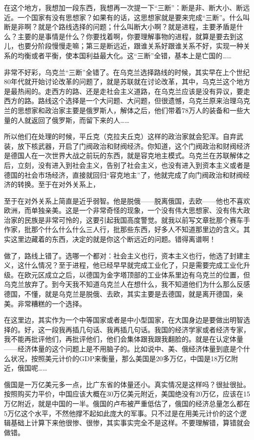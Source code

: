 \documentclass[UTF8, 12pt, a4paper]{ctexrep}
\begin{document}
在这个地方，我想加一段东西，我想再一次提一下“三断”：断是非、断大小、断远近。一个国家有没有思想家？如果有的话，这思想家就是要来完成“三断”。什么叫断是非啊？就是个路线选择的问题；什么叫断大小啊？就是进程，主要矛盾是什么？主要的是事情是什么？你要找着啊，你要理解事物的进程，就算是要去到这儿，也要分阶段慢慢走嘛；第三是断远近，跟谁关系好跟谁关系不好，实现一种关系的均衡或者平衡，使本国利益最大化。这“三断”全错，基本上是亡国的……

非常不好彩，乌克兰“三断”全错了。在乌克兰选择路线的时候，其实早在上个世纪80年代就开始讨论改革的问题了，就是苏联就在讨论改革，其中，乌克兰这个地方是最热闹的。走西方的路、还是走社会主义道路，在乌克兰应该是没有异议，要走西方的路。路线这个选择是一个大问题、大问题，但很遗憾，乌克兰原来治理乌克兰的思想家和政治家主要是俄罗斯人，解体之后，他们带着78万人的装备和一些大量的人就返回了俄罗斯，而留下来的人……

所以他们在处理的时候，平丘克（克拉夫丘克）这样的政治家就会犯浑。自弃武装，放下核武器，开启了门阀政治和财阀经济。你知道，这个门阀政治和财阀经济是德国人在一次世界大战之前玩的东西，就是容克地主模式。乌克兰在苏联解体之后，立刻，没有进入到社会主义，告别了社会主义，也没有进入到资本主义或者是德国的社会市场经济，直接就回归“容克地主”了，他就完成了向门阀政治和财阀经济的转换。至于在对外关系上，

至于在对外关系上简直是近乎弱智。他是脱俄——脱离俄国，去欧——他也不喜欢欧洲，而单独亲美。这是一个非常奇怪的现象，一个没有伟大思想家、没有伟大政治家的民族是非常可怜的，这要引起我国高度警觉。就我以前写文章批那个赛车手作家，批那个什么什么什么三人行，批那些东西，好多人不知道那里边的含义。其实这里边藏着的东西，决定的就是你这个断远近的问题。错得离谱啊！

做了，路线上错了。选哪一个都对：社会主义也行，资本主义也行，他选了封建主义，这什么情况？至于进程，他已经早早就完成工业化了，只是需要完成工业化升级。在欧元区成立之后，以德国为金字塔顶部的工业体系里边有乌克兰的位置，但乌克兰放弃了。到今天我不知道乌克兰人在想什么，我不知道他们为什么那么反感德国，不懂，就是乌克兰是脱俄、去欧，其实主要是去德国，就是离开德国，亲美。非常糟糕的一个选择。

在这里边，其实作为一个中等国家或者是中小型国家，在大国身边是要做出明智选择的。好，这一段我再插几句话、我再插几句话。我国的经济学家或者经济专家，我不能再批评他们，再批评他们，他们会集体跟我跟我翻脸的。就是在认定体量——经济体量的这个问题上是不用脑子的。比如说中、美、俄经济体量到底是个什么状况，按照美元计价的GDP来衡量，那么美国是20多万亿，中国是18万亿附近，俄国呢……

俄国是一万亿美元多一点，比广东省的体量还小。真实情况是这样吗？很扯很扯。按照购买力平价，中国应该大概在30万亿美元附近，美国绝没有20万亿，应该在15万亿附近，就是中国的一半。俄国的卢布被严重低估了，俄国的经济总量怎么都在5万亿这个水平，不然他撑不起如此庞大的军事。只不过是在用美元计价的这个逻辑基础上计算下来他很惨、很惨，其实事实完全不是这样。不要理解错，算错就会做错。
\end{document}
